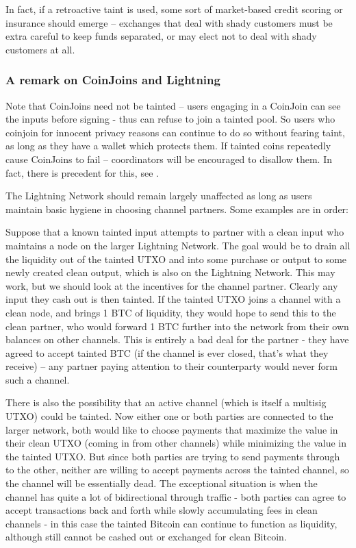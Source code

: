 \documentclass{article}%
\begin{document}
In fact, if a retroactive taint is used, some sort of market-based credit
scoring or insurance should emerge -- exchanges that deal with shady customers
must be extra careful to keep funds separated, or may elect not to deal with shady
customers at all.


\subsubsection{A remark on CoinJoins and Lightning}

Note that CoinJoins need not be tainted -- users engaging in a CoinJoin can see
the inputs before signing - thus can refuse to join a tainted pool.  So users who coinjoin for innocent privacy
reasons can continue to do so without fearing taint, as long as they have a
wallet which protects them.  If tainted coins repeatedly cause CoinJoins to fail -- coordinators will be encouraged to disallow them.  In fact, there is precedent for this, see \cite{coindesk2022wasabi}.

The Lightning Network should remain largely unaffected as long as users
maintain basic hygiene in choosing channel partners. Some examples are in order:

Suppose that a known tainted input attempts to partner with a clean input who
maintains a node on the larger Lightning Network.  The goal would be to drain
all the liquidity out of the tainted UTXO and into some purchase or output to
some newly created clean output, which is also on the Lightning Network.
 This may work, but we should look at the incentives for the channel
partner.  Clearly any input they cash out is then tainted.  If the tainted
UTXO joins a channel with a clean node, and brings 1 BTC of liquidity, they
would hope to send this to the clean partner, who would forward 1 BTC further
into the network from their own balances on other channels. This is entirely a
bad deal for the partner - they have agreed to accept tainted BTC (if the
channel is ever closed, that's what they receive) -- any partner paying
attention to their counterparty would never form such a channel.

 There is also the possibility that an active channel (which is itself a
multisig UTXO) could be tainted. Now either one or both parties are
connected to the larger network, both would like to choose payments that
maximize the value in their clean UTXO (coming in from other channels) while
minimizing the value in the tainted UTXO.  But since both parties are trying
to send payments through to the other, neither are willing to accept payments
across the tainted channel, so the channel will be essentially dead.  The
exceptional situation is when the channel has quite a lot of bidirectional
through traffic - both parties can agree to accept transactions back and forth
while slowly accumulating fees in clean channels - in this case the tainted
Bitcoin can continue to function as liquidity, although still cannot be cashed
out or exchanged for clean Bitcoin.
\end{document}
